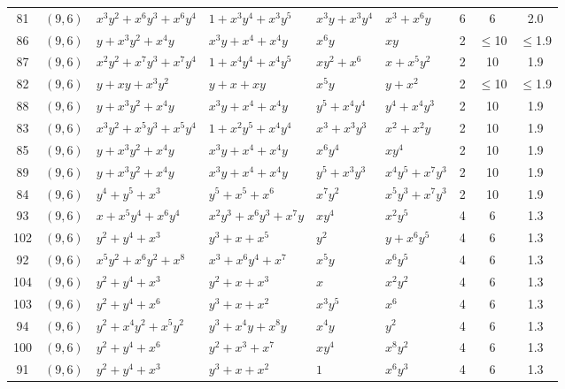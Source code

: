 \begin{table}[t]
\begin{tabular*}{\textwidth}{@{\extracolsep{\fill}}cllllllcc}
81 & $(9,6)$ & $x^{3}y^{2}{+}x^{6}y^{3}{+}x^{6}y^{4}$ & $1{+}x^{3}y^{4}{+}x^{3}y^{5}$ & $x^{3}y{+}x^{3}y^{4}$ & $x^{3}{+}x^{6}y$ & 6 & 6 & 2.0 \\
86 & $(9,6)$ & $y{+}x^{3}y^{2}{+}x^{4}y$ & $x^{3}y{+}x^{4}{+}x^{4}y$ & $x^{6}y$ & $xy$ & 2 & $\leq$10 & $\leq$1.9 \\
87 & $(9,6)$ & $x^{2}y^{2}{+}x^{7}y^{3}{+}x^{7}y^{4}$ & $1{+}x^{4}y^{4}{+}x^{4}y^{5}$ & $xy^{2}{+}x^{6}$ & $x{+}x^{5}y^{2}$ & 2 & 10 & 1.9 \\
82 & $(9,6)$ & $y{+}xy{+}x^{3}y^{2}$ & $y{+}x{+}xy$ & $x^{5}y$ & $y{+}x^{2}$ & 2 & $\leq$10 & $\leq$1.9 \\
88 & $(9,6)$ & $y{+}x^{3}y^{2}{+}x^{4}y$ & $x^{3}y{+}x^{4}{+}x^{4}y$ & $y^{5}{+}x^{4}y^{4}$ & $y^{4}{+}x^{4}y^{3}$ & 2 & 10 & 1.9 \\
83 & $(9,6)$ & $x^{3}y^{2}{+}x^{5}y^{3}{+}x^{5}y^{4}$ & $1{+}x^{2}y^{5}{+}x^{4}y^{4}$ & $x^{3}{+}x^{3}y^{3}$ & $x^{2}{+}x^{2}y$ & 2 & 10 & 1.9 \\
85 & $(9,6)$ & $y{+}x^{3}y^{2}{+}x^{4}y$ & $x^{3}y{+}x^{4}{+}x^{4}y$ & $x^{6}y^{4}$ & $xy^{4}$ & 2 & 10 & 1.9 \\
89 & $(9,6)$ & $y{+}x^{3}y^{2}{+}x^{4}y$ & $x^{3}y{+}x^{4}{+}x^{4}y$ & $y^{5}{+}x^{3}y^{3}$ & $x^{4}y^{5}{+}x^{7}y^{3}$ & 2 & 10 & 1.9 \\
84 & $(9,6)$ & $y^{4}{+}y^{5}{+}x^{3}$ & $y^{5}{+}x^{5}{+}x^{6}$ & $x^{7}y^{2}$ & $x^{5}y^{3}{+}x^{7}y^{3}$ & 2 & 10 & 1.9 \\
93 & $(9,6)$ & $x{+}x^{5}y^{4}{+}x^{6}y^{4}$ & $x^{2}y^{3}{+}x^{6}y^{3}{+}x^{7}y$ & $xy^{4}$ & $x^{2}y^{5}$ & 4 & 6 & 1.3 \\
102 & $(9,6)$ & $y^{2}{+}y^{4}{+}x^{3}$ & $y^{3}{+}x{+}x^{5}$ & $y^{2}$ & $y{+}x^{6}y^{5}$ & 4 & 6 & 1.3 \\
92 & $(9,6)$ & $x^{5}y^{2}{+}x^{6}y^{2}{+}x^{8}$ & $x^{3}{+}x^{6}y^{4}{+}x^{7}$ & $x^{5}y$ & $x^{6}y^{5}$ & 4 & 6 & 1.3 \\
104 & $(9,6)$ & $y^{2}{+}y^{4}{+}x^{3}$ & $y^{2}{+}x{+}x^{3}$ & $x$ & $x^{2}y^{2}$ & 4 & 6 & 1.3 \\
103 & $(9,6)$ & $y^{2}{+}y^{4}{+}x^{6}$ & $y^{3}{+}x{+}x^{2}$ & $x^{3}y^{5}$ & $x^{6}$ & 4 & 6 & 1.3 \\
94 & $(9,6)$ & $y^{2}{+}x^{4}y^{2}{+}x^{5}y^{2}$ & $y^{3}{+}x^{4}y{+}x^{8}y$ & $x^{4}y$ & $y^{2}$ & 4 & 6 & 1.3 \\
100 & $(9,6)$ & $y^{2}{+}y^{4}{+}x^{6}$ & $y^{2}{+}x^{3}{+}x^{7}$ & $xy^{4}$ & $x^{8}y^{2}$ & 4 & 6 & 1.3 \\
91 & $(9,6)$ & $y^{2}{+}y^{4}{+}x^{3}$ & $y^{3}{+}x{+}x^{2}$ & $1$ & $x^{6}y^{3}$ & 4 & 6 & 1.3 \\

\end{tabular*}
\end{table}

